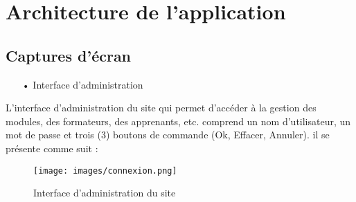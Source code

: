\begin{itemize}
		\end{itemize}
\section{Architecture de l'application}
	\subsection{Captures d'écran}
		\begin{itemize}
			\item[•]Interface d'administration
		\end{itemize}
L'interface d'administration du site qui permet d'accéder à la gestion des modules, des formateurs, des apprenants, etc. comprend un nom d'utilisateur, un mot de passe et trois (3) boutons de commande (Ok, Effacer, Annuler). il se présente comme suit :
		\begin{figure}[H]
			\begin{center}
				\caption{Interface d'administration du site}
				\texttt{[image: images/connexion.png]}
			\end{center}
		\end{figure}						
